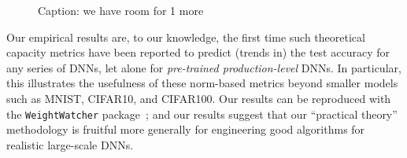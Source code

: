 \begin{figure}[H]
   \centering
   \caption{%
    Caption: we have room for 1 more 
   }
   \label{fig:alphahats}
\end{figure}


Our empirical results are, to our knowledge, the first time such theoretical capacity 
metrics have been reported to predict (trends in) the test accuracy for any series of DNNs, let alone for \emph{pre-trained production-level} DNNs.
In particular, this illustrates the usefulness of these norm-based metrics beyond smaller models such as MNIST, CIFAR10, and CIFAR100. 
Our  results can be reproduced with the \texttt{WeightWatcher} package~\cite{weightwatcher_package_justURL}; 
and our
results suggest that our ``practical theory'' methodology is fruitful more generally for engineering good algorithms for realistic large-scale DNNs.


